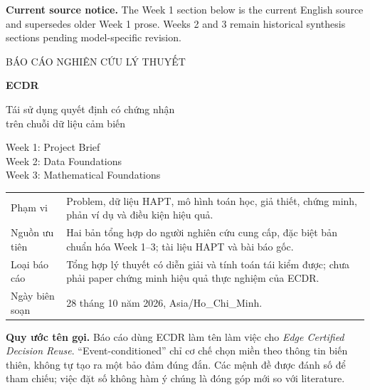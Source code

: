 \documentclass[11pt,a4paper]{article}
\theoremstyle{remark}
\begin{document}
\begin{titlepage}
\noindent\textbf{Current source notice.} The Week 1 section below is the current English source and supersedes older Week 1 prose. Weeks 2 and 3 remain historical synthesis sections pending model-specific revision.\par\vspace{0.4cm}
\vspace*{1.2cm}
{\Large\color{teal} BÁO CÁO NGHIÊN CỨU LÝ THUYẾT\par}
\vspace{0.7cm}
{\huge\bfseries\color{ink} ECDR\par}
\vspace{0.4cm}
{\LARGE Tái sử dụng quyết định có chứng nhận\\trên chuỗi dữ liệu cảm biến\par}
\vspace{0.8cm}
{\Large Week 1: Project Brief\\[4pt]
Week 2: Data Foundations\\[4pt]
Week 3: Mathematical Foundations\par}
\vspace{1cm}
\begin{tabularx}{\linewidth}{@{}lY@{}}
\toprule
Phạm vi & Problem, dữ liệu HAPT, mô hình toán học, giả thiết, chứng minh,
phản ví dụ và điều kiện hiệu quả.\\
Nguồn ưu tiên & Hai bản tổng hợp do người nghiên cứu cung cấp, đặc biệt bản
chuẩn hóa Week 1--3; tài liệu HAPT và bài báo gốc.\\
Loại báo cáo & Tổng hợp lý thuyết có diễn giải và tính toán tái kiểm được;
chưa phải paper chứng minh hiệu quả thực nghiệm của ECDR.\\
Ngày biên soạn & 28 tháng 10 năm 2026, Asia/Ho\_Chi\_Minh.\\
\bottomrule
\end{tabularx}
\vfill
\textbf{Quy ước tên gọi.} Báo cáo dùng ECDR làm tên làm việc cho
\emph{Edge Certified Decision Reuse}. ``Event-conditioned'' chỉ cơ chế chọn
miền theo thông tin biến thiên, không tự tạo ra một bảo đảm đúng đắn.
Các mệnh đề được đánh số để tham chiếu; việc đặt số không hàm ý chúng là
đóng góp mới so với literature.
\end{titlepage}
\end{document}
